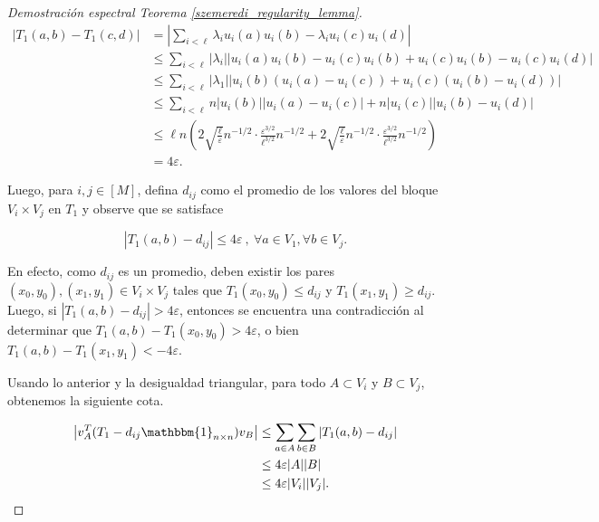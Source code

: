 \documentclass{article}[14pts]
\let\varepsilon=\varepsilon
\begin{document}
\begin{proof}[Demostración espectral Teorema \ref{szemeredi_regularity_lemma}]
    \begin{align*}
        \left| T_1(a,b) - T_1(c,d)\right| &= \left| \sum_{i < \ell} \lambda_i u_i(a) u_i(b) - \lambda_i u_i(c) u_i(d)\right|\\
        &\leq \sum_{i < \ell} \left| \lambda_i\right| \left| u_i(a) u_i(b) - u_i(c)u_i(b) + u_i(c)u_i(b) - u_i(c)u_i(d)\right|\\
        &\leq \sum_{i < \ell} \left| \lambda_1\right| \left| u_i(b)(u_i(a) - u_i(c)) + u_i(c)(u_i(b) - u_i(d))\right|\\
        &\leq \sum_{i < \ell} n \left| u_i(b)\right| \left| u_i(a) - u_i(c)\right| + n\left| u_i(c)\right| \left| u_i(b) - u_i(d)\right|\\
        &\leq \ell n\left( 2\sqrt{\frac{\ell}{\varepsilon}} n^{-1/2}\cdot \frac{\varepsilon^{3/2}}{\ell^{3/2}} n^{-1/2} + 2\sqrt{\frac{\ell}{\varepsilon}} n^{-1/2}\cdot \frac{\varepsilon^{3/2}}{\ell^{3/2}} n^{-1/2}\right)\\
        &= 4\varepsilon.
    \end{align*}\medskip

    Luego, para $i,j\in [M]$, defina $d_{ij}$ como el promedio de los valores del bloque $V_i \times V_j$ en $T_1$ y observe que se satisface\medskip

    \begin{equation*}
        \left| T_1(a,b) -d_{ij}\right| \leq 4\varepsilon\ ,\ \forall a\in V_1, \forall b\in V_j.
    \end{equation*}\medskip

    En efecto, como $d_{ij}$ es un promedio, deben existir los pares $(x_0, y_0), (x_1,y_1)\in V_i \times V_j$ tales que $T_1 (x_0, y_0) \leq d_{ij}$ y $T_1 (x_1,y_1) \geq d_{ij}$. Luego, si $\left| T_1 (a,b) - d_{ij}\right| > 4\varepsilon$, entonces se encuentra una contradicción al determinar que $T_1 (a,b) - T_1 (x_0, y_0) > 4\varepsilon$, o bien $T_1 (a,b) - T_1 (x_1, y_1) < -4\varepsilon$.\medskip

    Usando lo anterior y la desigualdad triangular, para todo $A\subset V_i$ y $B\subset V_j$, obtenemos la siguiente cota.\medskip

    \begin{align} \label{eq_5 Spectral_Proof}
        \left| v_{A}^{T} (T_1 - d_{ij}\mathbbm{1}_{n\times n}) v_B\right| &\leq \sum_{a\in A}\sum_{b\in B} \left| T_1 (a,b) - d_{ij}\right| \nonumber\\
        &\leq 4\varepsilon |A||B|\\
        &\leq 4\varepsilon |V_i| |V_j|\nonumber.
    \end{align}\medskip


\end{proof}
\end{document}
